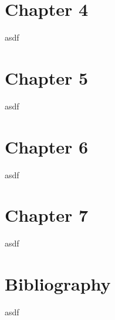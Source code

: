 \documentclass[paper=a4, fontsize=12pt]{scrartcl}
\begin{document}
\section{Chapter 4}
asdf
\section{Chapter 5}
asdf
\section{Chapter 6}
asdf
\section{Chapter 7}
asdf
\section{Bibliography}
asdf
\end{document}
